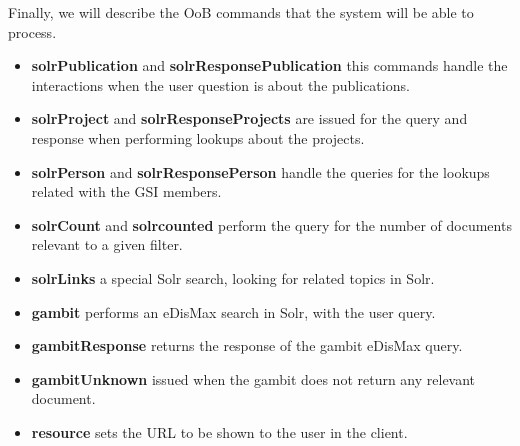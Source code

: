 Finally, we will describe the \ac{OoB} commands that the system will be able to process.

\begin{itemize}
 \item \textbf{solrPublication} and \textbf{solrResponsePublication} this commands handle the interactions when the user question is about the publications.
 \item \textbf{solrProject} and \textbf{solrResponseProjects} are issued for the query and response when performing lookups about the projects.
 \item \textbf{solrPerson} and \textbf{solrResponsePerson} handle the queries for the lookups related with the GSI members.
 \item \textbf{solrCount} and \textbf{solrcounted} perform the query for the number of documents relevant to a given filter.
 \item \textbf{solrLinks} a special Solr search, looking for related topics in Solr. 
 \item \textbf{gambit} performs an \ac{eDisMax} search in Solr, with the user query.
 \item \textbf{gambitResponse} returns the response of the gambit \ac{eDisMax} query.
 \item \textbf{gambitUnknown} issued when the gambit does not return any relevant document.
 \item \textbf{resource} sets the URL to be shown to the user in the client.
\end{itemize}

